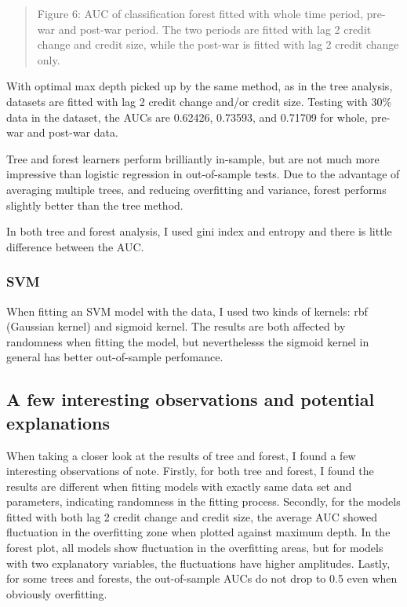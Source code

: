 \documentclass{article}
\newcommand{\ciapdf}[1]{\vspace*{-\parskip}\begin{center}\resizebox{0.75\textwidth}{!}{\texttt{[image: \#1]}}\end{center}}
\begin{document}
\ciapdf{Figure_7.pdf}
\begin{quote}
Figure 6: AUC of classification forest fitted with whole time period,
pre-war and post-war period. The two periods are fitted with lag 2 credit
change and credit size, while the post-war is fitted with lag 2 credit change
only.
\end{quote}

With optimal max depth picked up by the same method, as in the tree
analysis, datasets are fitted with lag 2 credit change and/or credit
size. Testing with 30\% data in the dataset, the AUCs are 0.62426,
0.73593, and 0.71709 for whole, pre-war and post-war data.

Tree and forest learners perform brilliantly in-sample, but
are not much more impressive than logistic regression in out-of-sample tests. Due
to the advantage of averaging multiple trees, and reducing overfitting and
variance, forest
performs slightly better than the tree method.

In both tree and forest analysis, I used gini index and entropy and
there is little difference between the AUC.

\subsubsection*{SVM}

When fitting an SVM model with the data, I used two kinds of kernels: rbf
(Gaussian kernel) and sigmoid kernel. The results are both affected by
randomness when fitting the model, but neverthelesss the sigmoid kernel in
general has better out-of-sample perfomance.


\subsection*{A few interesting observations and potential explanations}


When taking a closer look at the results of tree and forest, I found a
few interesting observations of note. Firstly, for both tree and forest, I found the
results are different when fitting models with exactly same data set and
parameters, indicating randomness in the
fitting process. Secondly, for the
models fitted with both lag 2 credit change and credit size, the average
AUC showed fluctuation in the overfitting zone when plotted against maximum depth.
In the forest plot,
all models show fluctuation in the overfitting areas, but for models
with two explanatory variables, the fluctuations have higher amplitudes.
Lastly, for some trees and forests, the out-of-sample AUCs do not drop to 0.5
even when obviously overfitting.
\end{document}
